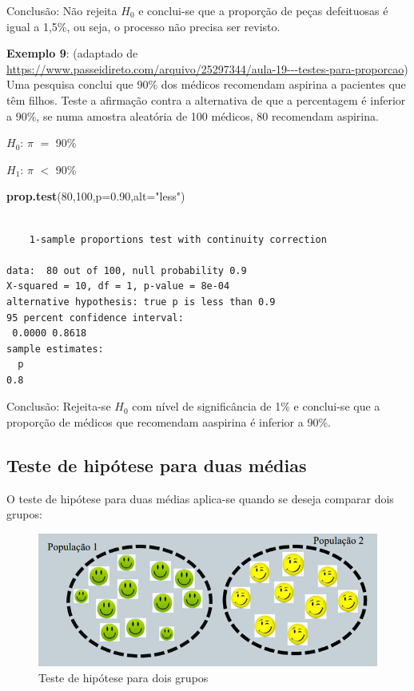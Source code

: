 \documentclass[12pt,brazil,oneside]{book}
\newenvironment{Shaded}{\begin{snugshade}}{\end{snugshade}}
\newcommand{\DataTypeTok}[1]{\textcolor[rgb]{0.13,0.29,0.53}{#1}}
\newcommand{\DecValTok}[1]{\textcolor[rgb]{0.00,0.00,0.81}{#1}}
\newcommand{\FloatTok}[1]{\textcolor[rgb]{0.00,0.00,0.81}{#1}}
\newcommand{\KeywordTok}[1]{\textcolor[rgb]{0.13,0.29,0.53}{\textbf{#1}}}
\newcommand{\NormalTok}[1]{#1}
\newcommand{\StringTok}[1]{\textcolor[rgb]{0.31,0.60,0.02}{#1}}
\begin{document}
Conclusão: Não rejeita \(H_0\) e conclui-se que a proporção de peças defeituosas é igual a 1,5\%, ou seja, o processo não precisa ser revisto.

\textbf{Exemplo 9}: (adaptado de \url{https://www.passeidireto.com/arquivo/25297344/aula-19---testes-para-proporcao}) Uma pesquisa conclui que 90\% dos médicos recomendam aspirina a pacientes que têm filhos. Teste a afirmação contra a alternativa de que a percentagem é inferior a 90\%, se numa amostra aleatória de 100 médicos, 80 recomendam aspirina.

\textbf{\(H_0\)}: \(\pi\) \(=\) 90\%

\textbf{\(H_1\)}: \(\pi\) \(<\) 90\%

\begin{Shaded}
\begin{Highlighting}[]
\KeywordTok{prop.test}\NormalTok{(}\DecValTok{80}\NormalTok{,}\DecValTok{100}\NormalTok{,}\DataTypeTok{p=}\FloatTok{0.90}\NormalTok{,}\DataTypeTok{alt=}\StringTok{"less"}\NormalTok{)}
\end{Highlighting}
\end{Shaded}

\begin{verbatim}

    1-sample proportions test with continuity correction

data:  80 out of 100, null probability 0.9
X-squared = 10, df = 1, p-value = 8e-04
alternative hypothesis: true p is less than 0.9
95 percent confidence interval:
 0.0000 0.8618
sample estimates:
  p 
0.8 
\end{verbatim}

Conclusão: Rejeita-se \(H_0\) com nível de significância de 1\% e conclui-se que a proporção de médicos que recomendam aaspirina é inferior a 90\%.

\hypertarget{teste-de-hipotese-para-duas-medias}{%
\subsection{Teste de hipótese para duas médias}\label{teste-de-hipotese-para-duas-medias}}

O teste de hipótese para duas médias aplica-se quando se deseja comparar dois grupos:

\begin{figure}[H]

{\centering \includegraphics[width=0.8\linewidth]{testehip2} 

}

\caption{Teste de hipótese para dois grupos}\label{fig:testehip2}
\end{figure}
\end{document}
